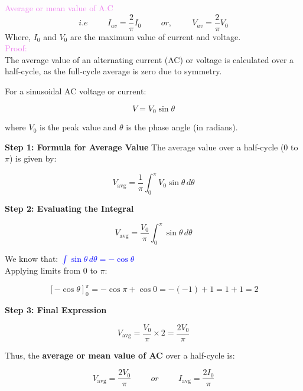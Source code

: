 \documentclass{beamer}
\begin{document}
\begin{frame}
\textcolor{violet}{Average or mean value of A.C}\\
\[
i.e\hspace{1cm} I_{av}=\frac{2}{\pi}I_0 \hspace{1cm} or, \hspace{1cm} V_{av}=\frac{2}{\pi}V_0
\]
Where, $I_0$ and $V_0$ are the maximum value of current and voltage.\\

\textcolor{violet}{Proof:}\\

The average value of an alternating current (AC) or voltage is calculated over a half-cycle, as the full-cycle average is zero due to symmetry.

For a sinusoidal AC voltage or current:

\[
V = V_0 \sin\theta
\]

where \( V_0 \) is the peak value and \( \theta \) is the phase angle (in radians).

\textbf{Step 1: Formula for Average Value}
The average value over a half-cycle (0 to \( \pi \)) is given by:

\end{frame}

\begin{frame}

\[
V_{\text{avg}} = \frac{1}{\pi} \int_0^\pi V_0 \sin\theta \, d\theta
\]

\textbf{Step 2: Evaluating the Integral}

\[
V_{\text{avg}} = \frac{V_0}{\pi} \int_0^\pi \sin\theta \, d\theta
\]

We know that: \textcolor{blue}{$\int \sin\theta \, d\theta = -\cos\theta$}\\


Applying limits from \( 0 \) to \( \pi \):

\[
\left[-\cos\theta\right]_0^\pi = -\cos\pi + \cos 0 = -(-1) + 1 = 1 + 1 = 2
\]

\textbf{Step 3: Final Expression}

\[
V_{\text{avg}} = \frac{V_0}{\pi} \times 2 = \frac{2V_0}{\pi}
\]

Thus, the \textbf{average or mean value of AC} over a half-cycle is:

\[
V_{\text{avg}} = \frac{2V_0}{\pi} \hspace{1cm} or \hspace{1cm} I_{\text{avg}} = \frac{2I_0}{\pi}
\]

\end{frame}
\end{document}
